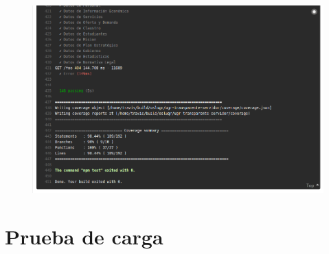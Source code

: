 \begin{figure}[!ht]
	\begin{center}
		\includegraphics[width=1\textwidth]{../images/integracion_continua_03.png}
		\caption{}
		\label{fig:integracion_continua_03}
	\end{center}
\end{figure}

\section{Prueba de carga}